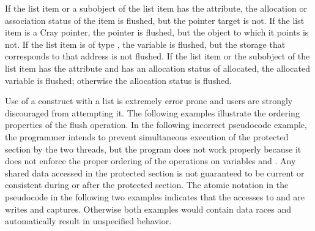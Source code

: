 \begin{fortranspecific}
If the list item or a subobject of the list item has the  attribute, the allocation 
or association status of the  item is flushed, but the pointer target is not. If the 
list item is a Cray pointer, the pointer is flushed, but the object to which it points is not. 
If the list item is of type , the variable is flushed, but the storage that corresponds 
to that address is not flushed. If the list item or the subobject of the list item has the 
 attribute and has an allocation status of allocated, the
allocated variable is flushed; otherwise the allocation status is flushed.
\end{fortranspecific}

\begin{note}
Use of a  construct with a list is extremely error prone and users are 
strongly discouraged from attempting it. The following examples illustrate the ordering 
properties of the flush operation. In the following incorrect pseudocode example, the 
programmer intends to prevent simultaneous execution of the protected section by the 
two threads, but the program does not work properly because it does not enforce the 
proper ordering of the operations on variables  and . Any shared data accessed in the 
protected section is not guaranteed to be current or consistent during or after the 
protected section. The atomic notation in the pseudocode in the following two examples 
indicates that the accesses to  and  are  writes and captures. Otherwise both 
examples would contain data races and automatically result in unspecified behavior. 



\end{note}
